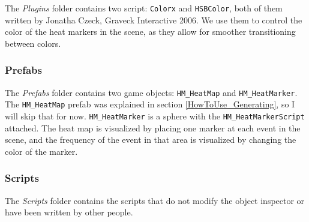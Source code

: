 The \textit{Plugins} folder contains two script: \texttt{Colorx} and \texttt{HSBColor}, both of them written by Jonatha Czeck, Graveck Interactive 2006. We use them to control the color of the heat markers in the scene, as they allow for smoother transitioning between colors.

\subsubsection*{Prefabs}
\label{Overview_Folder_Prefabs}

The \textit{Prefabs} folder contains two game objects: \texttt{HM\_HeatMap} and \texttt{HM\_HeatMarker}. The \texttt{HM\_HeatMap} prefab was explained in section \ref{HowToUse_Generating}, so I will skip that for now. \texttt{HM\_HeatMarker} is a sphere with the \texttt{HM\_HeatMarkerScript} attached. The heat map is visualized by placing one marker at each event in the scene, and the frequency of the event in that area is visualized by changing the color of the marker.

\subsubsection*{Scripts}
\label{Overview_Folder_Scripts}

The \textit{Scripts} folder contains the scripts that do not modify the object inspector or have been written by other people.

